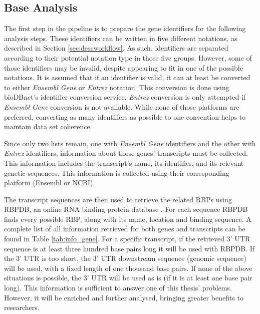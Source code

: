 \subsection{Base Analysis}

The first step in the pipeline is to prepare the gene identifiers for the
following analysis steps. These identifiers can be written in five different
notations, as described in Section \ref{sec:descworkflow}. As such, identifiers
are separated according to their potential notation type in those five groups.
However, some of those identifiers may be invalid, despite appearing to fit in
one of the possible notations. It is assumed that if an identifier is valid, it
can at least be converted to either \emph{Ensembl Gene} or \emph{Entrez}
notation. This conversion is done using bioDBnet's \cite{Mudunuri15022009}
identifier conversion service. \emph{Entrez} conversion is only attempted if
\emph{Ensembl Gene} conversion is not available. While none of those platforms
are preferred, converting as many identifiers as possible to one convention
helps to maintain data set coherence.

Since only two lists remain, one with \emph{Ensembl Gene} identifiers and the
other with \emph{Entrez} identifiers, information about those genes' transcripts
must be collected. This information includes the transcript's name, its
identifier, and its relevant genetic sequences. This information is collected
using their corresponding platform (Ensembl or NCBI).

The transcript sequences are then used to retrieve the related RBPs using RBPDB,
an online RNA binding protein database \cite{Cook01012011}. For each sequence
RBPDB finds every possible RBP, along with its name, location and binding
sequence. A complete list of all information retrieved for both genes and
transcripts can be found in Table \ref{tab:info_gene}. For a specific
transcript, if the retrieved 3’ UTR sequence is at least three hundred base
pairs long it will be used with RBPDB. If the 3’ UTR is too short, the 3’ UTR
downstream sequence (genomic sequence) will be used, with a fixed length of one
thousand base pairs. If none of the above situations is possible, the 3’ UTR
will be used as is (if it is at least one base pair long). This information is
sufficient to answer one of this thesis' problems. However, it will be enriched
and further analysed, bringing greater benefits to researchers.

